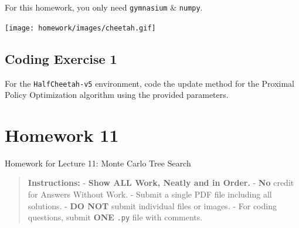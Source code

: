\documentclass[
  letterpaper,
  DIV=11,
  numbers=noendperiod]{scrreprt}
\makeatletter
\newcommand*\pandocbounded[1]{%
  \sbox\pandoc@box{#1}%
  \Gscale@div\@tempa{\textheight}{\dimexpr\ht\pandoc@box+\dp\pandoc@box\relax}%
  \Gscale@div\@tempb{\linewidth}{\wd\pandoc@box}%
  \ifdim\@tempb\p@<\@tempa\p@\let\@tempa\@tempb\fi%
  \ifdim\@tempa\p@<\p@\scalebox{\@tempa}{\usebox\pandoc@box}%
  \else\usebox{\pandoc@box}%
  \fi%
}
\makeatother
\begin{document}
\begin{tcolorbox}[enhanced jigsaw, opacityback=0, left=2mm, breakable, bottomtitle=1mm, rightrule=.15mm, colframe=quarto-callout-note-color-frame, titlerule=0mm, colback=white, opacitybacktitle=0.6, toptitle=1mm, title=\textcolor{quarto-callout-note-color}{\faInfo}\hspace{0.5em}{Note}, colbacktitle=quarto-callout-note-color!10!white, bottomrule=.15mm, arc=.35mm, coltitle=black, leftrule=.75mm, toprule=.15mm]

For this homework, you only need \texttt{gymnasium} \& \texttt{numpy}.

\end{tcolorbox}

\begin{center}
\texttt{[image: homework/images/cheetah.gif]}
\end{center}

\section{Coding Exercise 1}\label{coding-exercise-1-7}

For the \texttt{HalfCheetah-v5} environment, code the update method for
the Proximal Policy Optimization algorithm using the provided
parameters.

\section{\texorpdfstring{\href{https://colab.research.google.com/drive/1Y_A4uKoSmjc6EmU-Or7tbeo3fe_ZD4RH?usp=sharing}{\protect\pandocbounded{}}}{}}\label{section-8}

\chapter{Homework 11}\label{homework-11}

\begin{tcolorbox}[enhanced jigsaw, colback=white, left=2mm, breakable, opacityback=0, bottomrule=.15mm, rightrule=.15mm, arc=.35mm, colframe=quarto-callout-note-color-frame, leftrule=.75mm, toprule=.15mm]

Homework for Lecture 11: Monte Carlo Tree Search 📝

\end{tcolorbox}

\begin{quote}
\textbf{Instructions:} - \textbf{Show ALL Work, Neatly and in Order.} -
\textbf{No} credit for Answers Without Work. - Submit a single PDF file
including all solutions. - \textbf{DO NOT} submit individual files or
images. - For coding questions, submit \textbf{ONE} \texttt{.py} file
with comments.
\end{quote}
\end{document}
